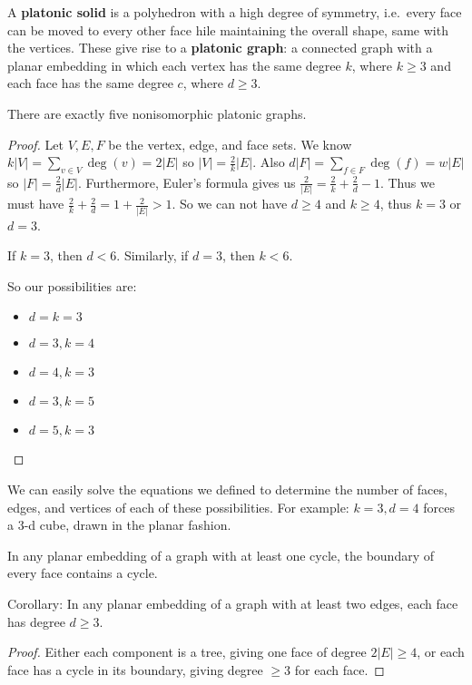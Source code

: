 \documentclass[12pt]{article}
\begin{document}
A {\bf platonic solid} is a polyhedron with a high degree of symmetry, i.e.\ every face can be moved to every other face hile maintaining the overall shape, same with the vertices. These give rise to a {\bf platonic graph}: a connected graph with a planar embedding in which each vertex has the same degree $k$, where $k\geq 3$ and each face has the same degree $c$, where $d\geq 3$.

\begin{theorem}
There are exactly five nonisomorphic platonic graphs.
\end{theorem}

\begin{proof}
Let $V, E, F$ be the vertex, edge, and face sets. We know $k|V| = \displaystyle\sum_{v\in V} \deg(v) = 2|E|$ so $|V| = \frac{2}{k}|E|$. Also $d|F| = \displaystyle\sum_{f\in F} \deg(f) = w|E|$ so $|F| = \frac{2}{d}|E|$. Furthermore, Euler's formula gives us $\frac{2}{|E|} = \frac{2}{k} + \frac{2}{d} - 1$. Thus we must have $\frac{2}{k} + \frac{2}{d} = 1 + \frac{2}{|E|} > 1$. So we can not have $d \geq 4$ and $k \geq 4$, thus $k = 3$ or $d = 3$.

If $k = 3$, then $d < 6$. Similarly, if $d = 3$, then $k < 6$.

So our possibilities are:
\begin{itemize}
\item $d = k = 3$
\item $d = 3, k = 4$
\item $d = 4, k = 3$
\item $d = 3, k = 5$
\item $d = 5, k = 3$
\end{itemize}
\end{proof}

We can easily solve the equations we defined to determine the number of faces, edges, and vertices of each of these possibilities. For example: $k = 3, d = 4$ forces a 3-d cube, drawn in the planar fashion.


\begin{lemma}
In any planar embedding of a graph with at least one cycle, the boundary of every face contains a cycle.
\end{lemma}

Corollary: In any planar embedding of a graph with at least two edges, each face has degree $d \geq 3$.

\begin{proof}
Either each component is a tree, giving one face of degree $2|E| \geq 4$, or each face has a cycle in its boundary, giving degree $\geq 3$ for each face.
\end{proof}
\end{document}
